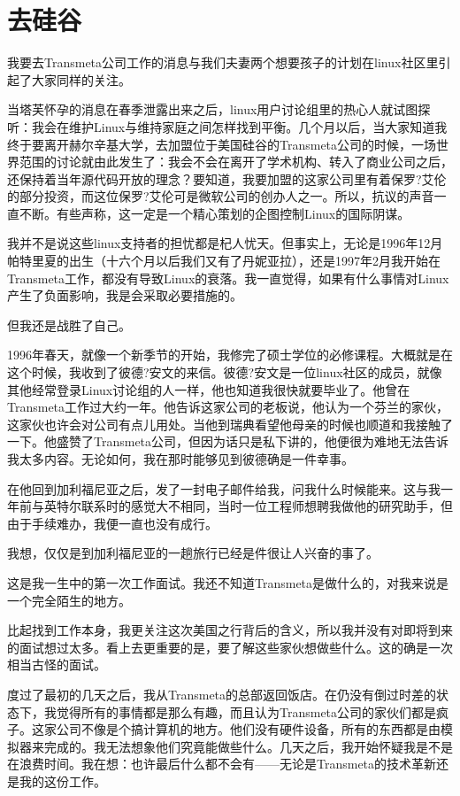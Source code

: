  
\section{去硅谷}

我要去Transmeta公司工作的消息与我们夫妻两个想要孩子的计划在linux社区里引起了大家同样的关注。

当塔芙怀孕的消息在春季泄露出来之后，linux用户讨论组里的热心人就试图探听：我会在维护Linux与维持家庭之间怎样找到平衡。几个月以后，当大家知道我终于要离开赫尔辛基大学，去加盟位于美国硅谷的Transmeta公司的时候，一场世界范围的讨论就由此发生了：我会不会在离开了学术机构、转入了商业公司之后，还保持着当年源代码开放的理念？要知道，我要加盟的这家公司里有着保罗?艾伦的部分投资，而这位保罗?艾伦可是微软公司的创办人之一。所以，抗议的声音一直不断。有些声称，这一定是一个精心策划的企图控制Linux的国际阴谋。

我并不是说这些linux支持者的担忧都是杞人忧天。但事实上，无论是1996年12月帕特里夏的出生（十六个月以后我们又有了丹妮亚拉），还是1997年2月我开始在Transmeta工作，都没有导致Linux的衰落。我一直觉得，如果有什么事情对Linux产生了负面影响，我是会采取必要措施的。

但我还是战胜了自己。

1996年春天，就像一个新季节的开始，我修完了硕士学位的必修课程。大概就是在这个时候，我收到了彼德?安文的来信。彼德?安文是一位linux社区的成员，就像其他经常登录Linux讨论组的人一样，他也知道我很快就要毕业了。他曾在Transmeta工作过大约一年。他告诉这家公司的老板说，他认为一个芬兰的家伙，这家伙也许会对公司有点儿用处。当他到瑞典看望他母亲的时候也顺道和我接触了一下。他盛赞了Transmeta公司，但因为话只是私下讲的，他便很为难地无法告诉我太多内容。无论如何，我在那时能够见到彼德确是一件幸事。

在他回到加利福尼亚之后，发了一封电子邮件给我，问我什么时候能来。这与我一年前与英特尔联系时的感觉大不相同，当时一位工程师想聘我做他的研究助手，但由于手续难办，我便一直也没有成行。

我想，仅仅是到加利福尼亚的一趟旅行已经是件很让人兴奋的事了。

这是我一生中的第一次工作面试。我还不知道Transmeta是做什么的，对我来说是一个完全陌生的地方。

比起找到工作本身，我更关注这次美国之行背后的含义，所以我并没有对即将到来的面试想过太多。看上去更重要的是，要了解这些家伙想做些什么。这的确是一次相当古怪的面试。

度过了最初的几天之后，我从Transmeta的总部返回饭店。在仍没有倒过时差的状态下，我觉得所有的事情都是那么有趣，而且认为Transmeta公司的家伙们都是疯子。这家公司不像是个搞计算机的地方。他们没有硬件设备，所有的东西都是由模拟器来完成的。我无法想象他们究竟能做些什么。几天之后，我开始怀疑我是不是在浪费时间。我在想：也许最后什么都不会有——无论是Transmeta的技术革新还是我的这份工作。


